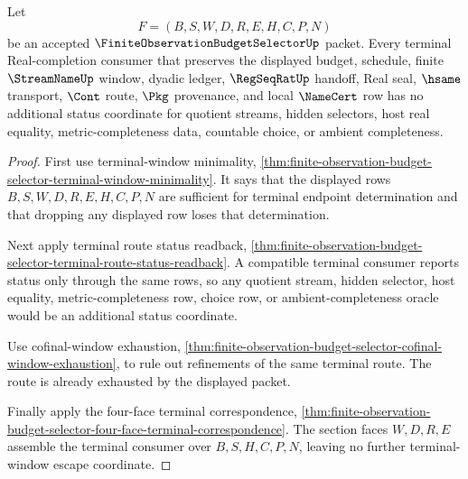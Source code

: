 \begin{theorem}
\label{thm:finite-observation-budget-selector-terminal-window-nonescape}
Let
$$
F=(B,S,W,D,R,E,H,C,P,N)
$$
be an accepted $\FiniteObservationBudgetSelectorUp$ packet. Every terminal Real-completion consumer that preserves the displayed budget, schedule, finite $\StreamNameUp$ window, dyadic ledger, $\RegSeqRatUp$ handoff, Real seal, $\hsame$ transport, $\Cont$ route, $\Pkg$ provenance, and local $\NameCert$ row has no additional status coordinate for quotient streams, hidden selectors, host real equality, metric-completeness data, countable choice, or ambient completeness.
\end{theorem}
\begin{proof}
First use terminal-window minimality, \autoref{thm:finite-observation-budget-selector-terminal-window-minimality}. It says that the displayed rows $B,S,W,D,R,E,H,C,P,N$ are sufficient for terminal endpoint determination and that dropping any displayed row loses that determination.

Next apply terminal route status readback, \autoref{thm:finite-observation-budget-selector-terminal-route-status-readback}. A compatible terminal consumer reports status only through the same rows, so any quotient stream, hidden selector, host equality, metric-completeness row, choice row, or ambient-completeness oracle would be an additional status coordinate.

Use cofinal-window exhaustion, \autoref{thm:finite-observation-budget-selector-cofinal-window-exhaustion}, to rule out refinements of the same terminal route. The route is already exhausted by the displayed packet.

Finally apply the four-face terminal correspondence, \autoref{thm:finite-observation-budget-selector-four-face-terminal-correspondence}. The section faces $W,D,R,E$ assemble the terminal consumer over $B,S,H,C,P,N$, leaving no further terminal-window escape coordinate.
\end{proof}

